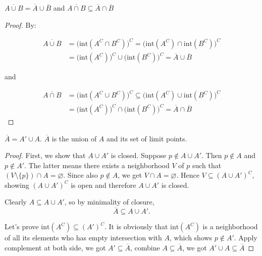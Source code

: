 \begin{thm}
    $\overline{A \cup B} = \overline{A} \cup \overline{B}$ and  $\overline{A \cap B} \subseteq \overline{A} \cap \overline{B}$
\end{thm}

\begin{proof}
   By:
   
   \begin{align*}
    \overline{A \cup B} &= \bigl( \mathrm{int}(A^C \cap B^C) \bigr)^C = \bigl( \mathrm{int}(A^C) \cap \mathrm{int}(B^C) \bigr)^C \\
    & = \bigl( \mathrm{int}(A^C) \bigr)^C \cup \bigl( \mathrm{int}(B^C) \bigr)^C = \overline{A} \cup \overline{B}
   \end{align*}

   and


   \begin{align*}
    \overline{A \cap B} &= \bigl( \mathrm{int}(A^C \cup B^C) \bigr)^C \subseteq \bigl( \mathrm{int}(A^C) \cup \mathrm{int}(B^C) \bigr)^C \\
    & = \bigl( \mathrm{int}(A^C) \bigr)^C \cap \bigl( \mathrm{int}(B^C) \bigr)^C = \overline{A} \cap \overline{B}
   \end{align*}
\end{proof}

\begin{thm}
    $\overline{A} = A' \cup A$. $\overline{A}$ is the union of $A$ and its set of limit points.
\end{thm}

\begin{proof}
    First, we show that $A \cup A'$ is closed. Suppose $p \notin A \cup A'$. 
    Then $p \notin A$ and $p \notin A'$. 
    The latter means there exists a neighborhood $V$ of $p$ such that 
    $(V \setminus \{p\}) \cap A = \varnothing$. Since also $p \notin A$, we get $V \cap A = \varnothing$. 
    Hence $V \subseteq (A \cup A')^C$, showing $(A \cup A')^C$ is open and therefore $A \cup A'$ is closed.

    Clearly $A \subseteq A \cup A'$, so by minimality of closure,
    \[
        \overline{A} \subseteq A \cup A'.
    \]

    Let's prove $\mathrm{int}(A^C) \subseteq (A')^C$. It is obviously that 
    $\mathrm{int}(A^C)$ is a neighborhood of all its elements who has empty
    intersection with $A$, which shows $p \notin A'$. Apply complement at both side,
    we got $A' \subseteq \overline{A}$, combine $A \subseteq \overline{A}$, we got 
    $A' \cup A \subseteq \overline{A}$
\end{proof}

